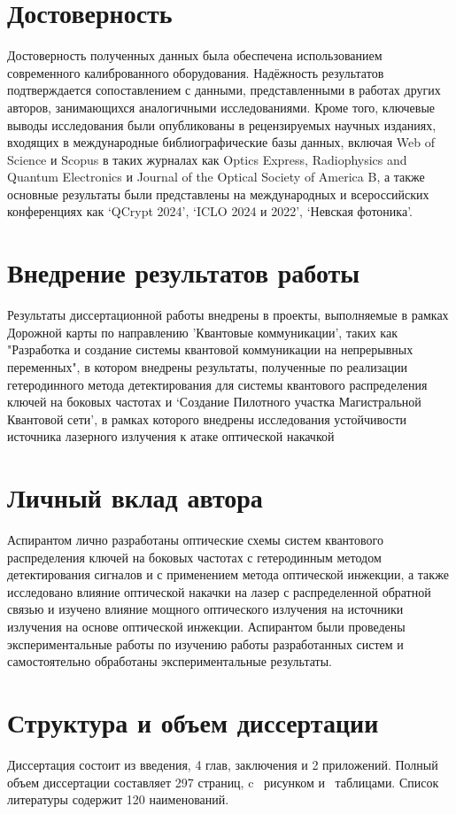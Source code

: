 \section*{Достоверность}
Достоверность полученных данных была обеспечена использованием современного калиброванного оборудования. Надёжность результатов подтверждается сопоставлением с данными, представленными в работах других авторов, занимающихся аналогичными исследованиями. 
Кроме того, ключевые выводы исследования были опубликованы в рецензируемых научных изданиях, входящих в международные библиографические базы данных, включая Web of Science и Scopus в таких журналах как Optics Express, Radiophysics and Quantum Electronics и Journal of the Optical Society of America B, а также основные результаты были представлены на международных и всероссийских конференциях как `QCrypt 2024', `ICLO 2024 и 2022', `Невская фотоника'.
\section*{Внедрение результатов работы}
Результаты диссертационной работы внедрены в проекты, выполняемые в рамках Дорожной карты по направлению 'Квантовые коммуникации', таких как  "Разработка и создание системы квантовой коммуникации на непрерывных переменных", в котором внедрены результаты, полученные по реализации гетеродинного метода детектирования для системы квантового распределения ключей на боковых частотах  и `Создание Пилотного участка Магистральной Квантовой сети', в рамках которого внедрены исследования устойчивости источника лазерного излучения к атаке оптической накачкой


\section*{Личный вклад автора}
Аспирантом лично разработаны оптические схемы систем квантового распределения ключей на боковых частотах с гетеродинным методом детектирования сигналов и с применением метода оптической инжекции, а также исследовано влияние оптической накачки на лазер с распределенной обратной связью и изучено влияние мощного оптического излучения на источники излучения на основе оптической инжекции. Аспирантом были проведены экспериментальные работы по изучению работы разработанных систем и самостоятельно обработаны экспериментальные результаты.
\section*{Структура и объем диссертации} Диссертация состоит из введения, 4 глав, заключения и 2 приложений. Полный объем диссертации составляет  297 страниц, c  \totalfigures\ рисунком  и \totaltables\ таблицами. Список литературы содержит 120 наименований.



